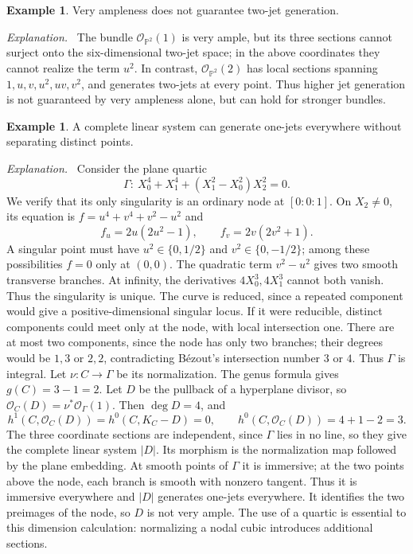 \documentclass[12pt,a4paper,psamsfonts]{amsart}
\theoremstyle{definition}
\newtheorem{example}[lemma]{Example}
\newenvironment{explanation}{\par\noindent\emph{Explanation.}\ }{\par}
\newcommand{\OO}{\mathcal O}
\begin{document}
\begin{example}
Very ampleness does not guarantee two-jet generation.
\end{example}
\begin{explanation}
The bundle $\OO_{\mathbb P^2}(1)$ is very ample, but its three sections
cannot surject onto the six-dimensional two-jet space; in the above
coordinates they cannot realize the term $u^2$.
In contrast, $\OO_{\mathbb P^2}(2)$ has local sections spanning
$1,u,v,u^2,uv,v^2$, and generates two-jets at every point.
Thus higher jet generation is not guaranteed by very ampleness alone,
but can hold for stronger bundles.
\end{explanation}

\begin{example}
A complete linear system can generate one-jets everywhere without
separating distinct points.
\end{example}
\begin{explanation}
Consider the plane quartic
\[
 \Gamma:\ X_0^4+X_1^4+(X_1^2-X_0^2)X_2^2=0.
\]
We verify that its only singularity is an ordinary node at $[0:0:1]$.
On $X_2\ne0$, its equation is $f=u^4+v^4+v^2-u^2$ and
\[
 f_u=2u(2u^2-1),\qquad f_v=2v(2v^2+1).
\]
A singular point must have $u^2\in\{0,1/2\}$ and
$v^2\in\{0,-1/2\}$; among these possibilities $f=0$ only at $(0,0)$.
The quadratic term $v^2-u^2$ gives two smooth transverse branches.
At infinity, the derivatives $4X_0^3,4X_1^3$ cannot both vanish.
Thus the singularity is unique. The curve is reduced, since a repeated
component would give a positive-dimensional singular locus. If it were
reducible, distinct components could meet only at the node, with local
intersection one. There are at most two components, since the node has
only two branches; their degrees would be $1,3$ or $2,2$, contradicting
B\'ezout's intersection number $3$ or $4$. Thus $\Gamma$ is integral.
Let $\nu:C\to\Gamma$ be its normalization.
The genus formula gives $g(C)=3-1=2$. Let $D$ be the pullback of a hyperplane divisor, so
$\OO_C(D)=\nu^*\OO_\Gamma(1)$.
Then $\deg D=4$, and
\[
 h^1(C,\OO_C(D))=h^0(C,K_C-D)=0,\qquad h^0(C,\OO_C(D))=4+1-2=3.
\]
The three coordinate sections are independent, since $\Gamma$ lies in
no line, so they give the complete linear system $|D|$.
Its morphism is the normalization map followed by the plane embedding.
At smooth points of $\Gamma$ it is immersive; at the two points above
the node, each branch is smooth with nonzero tangent. Thus it is
immersive everywhere and $|D|$ generates one-jets everywhere.
It identifies the two preimages of the node, so $D$ is not very ample.
The use of a quartic is essential to this dimension calculation:
normalizing a nodal cubic introduces additional sections.
\end{explanation}
\end{document}
